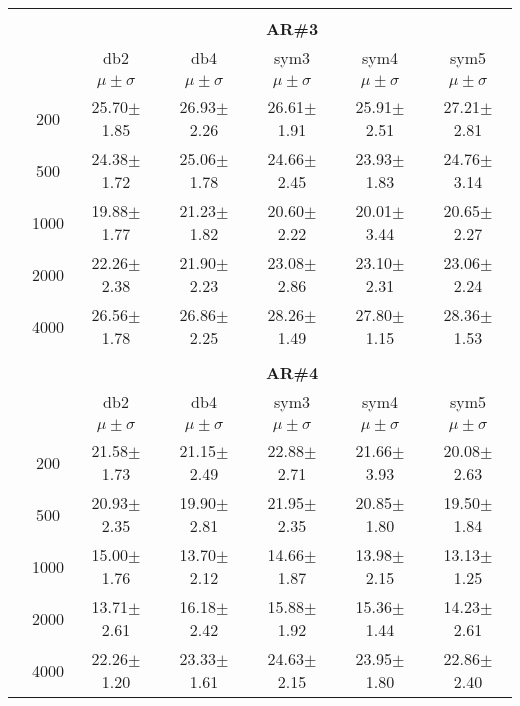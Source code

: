 \begin{table}[H]
\begin{tabular}{|c|c|c c c c c|}
	


\\ \midrule
\multicolumn{7}{c}{}\\ 



\cline{3-7}
\multicolumn{2}{c|}{\multirow{3}{*}{}} & \multicolumn{5}{c|}{\textbf{AR\#3}}   \\\cline{3-7} 

\multicolumn{2}{c|}{}  & db2 & db4 & sym3 & sym4 & sym5 \\\cline{3-7}
\multicolumn{2}{c|}{}& $\mu \pm \sigma$ & $\mu \pm \sigma$ & $\mu \pm \sigma$ & $\mu \pm \sigma$ & $\mu \pm \sigma$ \\\hline

\multicolumn{1}{|c|}{ \multirow{5}{*}{\rotatebox[origin=c]{90}{\textbf{Neurônios}}} }
&200	&25.70$\pm$1.85	&26.93$\pm$2.26	&26.61$\pm$1.91	&25.91$\pm$2.51	&27.21$\pm$2.81\\\cline{2-7}
&500	&24.38$\pm$1.72	&25.06$\pm$1.78	&24.66$\pm$2.45	&23.93$\pm$1.83	&24.76$\pm$3.14\\\cline{2-7}
&1000	&19.88$\pm$1.77	&21.23$\pm$1.82	&20.60$\pm$2.22	&20.01$\pm$3.44	&20.65$\pm$2.27\\\cline{2-7}
&2000	&22.26$\pm$2.38	&21.90$\pm$2.23	&23.08$\pm$2.86	&23.10$\pm$2.31 &23.06$\pm$2.24\\\cline{2-7}
&4000	&26.56$\pm$1.78 &26.86$\pm$2.25	&28.26$\pm$1.49	&27.80$\pm$1.15	&28.36$\pm$1.53





\\\midrule 
\multicolumn{7}{c}{}\\ 



\cline{3-7}
\multicolumn{2}{c|}{\multirow{3}{*}{}} & \multicolumn{5}{c|}{\textbf{AR\#4}}   \\\cline{3-7} 

\multicolumn{2}{c|}{}  & db2 & db4 & sym3 & sym4 & sym5 \\\cline{3-7}
\multicolumn{2}{c|}{}& $\mu \pm \sigma$ & $\mu \pm \sigma$ & $\mu \pm \sigma$ & $\mu \pm \sigma$ & $\mu \pm \sigma$ \\\hline

\multicolumn{1}{|c|}{ \multirow{5}{*}{\rotatebox[origin=c]{90}{\textbf{Neurônios}}} }
&200	&21.58$\pm$1.73	&21.15$\pm$2.49	&22.88$\pm$2.71	&21.66$\pm$3.93	&20.08$\pm$2.63\\\cline{2-7}
&500	&20.93$\pm$2.35	&19.90$\pm$2.81	&21.95$\pm$2.35	&20.85$\pm$1.80	&19.50$\pm$1.84\\\cline{2-7}
&1000	&15.00$\pm$1.76	&13.70$\pm$2.12	&14.66$\pm$1.87	&13.98$\pm$2.15	&13.13$\pm$1.25\\\cline{2-7}
&2000	&13.71$\pm$2.61	&16.18$\pm$2.42	&15.88$\pm$1.92	&15.36$\pm$1.44	&14.23$\pm$2.61\\\cline{2-7}
&4000	&22.26$\pm$1.20	&23.33$\pm$1.61	&24.63$\pm$2.15	&23.95$\pm$1.80	&22.86$\pm$2.40


\end{tabular}
\end{table}

